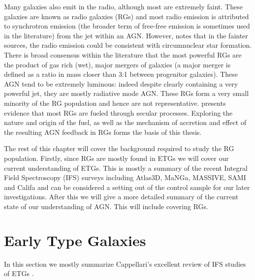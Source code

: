 Many galaxies also emit in the radio, although most are extremely faint. These galaxies are known as radio galaxies (RGs) and most radio emission is attributed to synchrotron emission (the broader term of free-free emission is sometimes used in the literature) from the jet within an AGN. However, \citet{Nyland2016} notes that in the fainter sources, the radio emission could be consistent with circumnuclear star formation. There is broad consensus within the literature that the most powerful RGs are the product of gas rich (wet), major mergers of galaxies (a major merger is defined as a ratio in mass closer than 3:1 between progenitor galaxies). These AGN tend to be extremely luminous: indeed despite clearly containing a very powerful jet, they are mostly radiative mode AGN. These RGs form a very small minority of the RG population and hence are not representative. \citet{Heckman2014} presents evidence that most RGs are fueled through secular processes. Exploring the nature and origin of the fuel, as well as the mechanism of accretion and effect of the resulting AGN feedback in RGs forms the basis of this thesis. 

The rest of this chapter will cover the background required to study the RG population. Firstly, since RGs are mostly found in ETGs we will cover our current understanding of ETGs. This is mostly a summary of the recent Integral Field Spectroscopy (IFS) surveys including Atlas3D, MaNGa, MASSIVE, SAMI and Califa and can be considered a setting out of the control sample for our later investigations. After this we will give a more detailed summary of the current state of our understanding of AGN. This will include covering RGs.

\section{Early Type Galaxies}
	\label{sec:introETG}
	In this section we mostly summarize Cappellari's excellent review of IFS studies of ETGs \citep{Cappellari2016}. 

